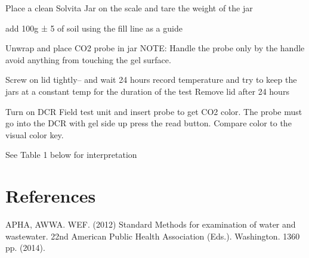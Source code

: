 \documentclass[12pt]{../SOP2}
\begin{document}
\NP Place a clean Solvita Jar on the scale and tare the weight of the jar 

\NP add 100g ± 5 of soil using the fill line as a guide

\NP Unwrap and place CO2 probe in jar NOTE: Handle the probe only by the handle avoid anything from touching the gel surface.

\NP Screw on lid tightly-- and wait 24 hours
record temperature and try to keep the jars at a constant temp for the duration of the test
Remove lid after 24 hours

\NP Turn on DCR Field test unit and insert probe to get CO2 color. The probe must go into the DCR with gel side up press the read button. Compare color to the visual color key.

\NP See Table 1 below for interpretation


\section{References}

\NP APHA, AWWA. WEF. (2012) Standard Methods for examination of water and wastewater. 22nd American Public Health Association (Eds.). Washington. 1360 pp. (2014).
\end{document}

